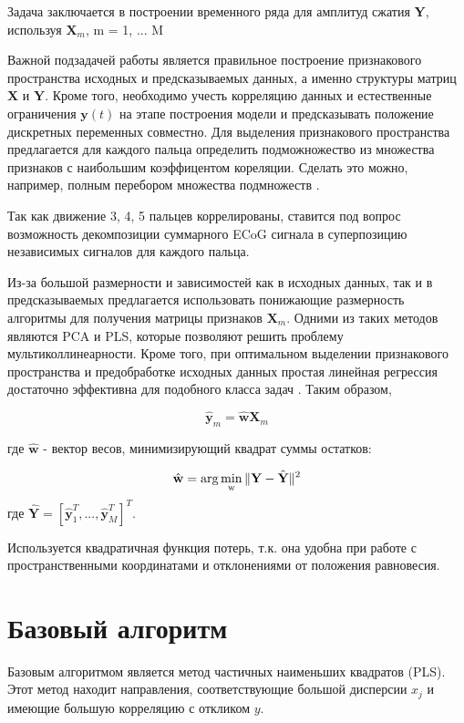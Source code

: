 \documentclass[12pt,twoside]{article}
\begin{document}
Задача заключается в построении временного ряда для амплитуд сжатия \textbf{Y}, используя $\textbf{X}_m$, m = 1, ... M
		
		Важной подзадачей работы является правильное построение признакового пространства исходных и предсказываемых данных, а именно структуры матриц $\mathbf{X}$ и $\mathbf{Y}$. Кроме того, необходимо учесть корреляцию данных и естественные ограничения $\mathbf{y}(t)$ на этапе построения модели и предсказывать положение дискретных переменных совместно. Для выделения признакового пространства предлагается для каждого пальца определить подможножество из множества признаков с наибольшим коэффицентом кореляции. Сделать это можно, например, полным перебором множества подмножеств   \cite{oai:hal.inria.fr:hal-00762316}. 
		

Так как движение 3, 4, 5 пальцев коррелированы, ставится под вопрос возможность декомпозиции суммарного ECoG сигнала в суперпозицию независимых сигналов для каждого пальца.

Из-за большой размерности и зависимостей как в исходных данных, так и в предсказываемых предлагается использовать понижающие размерность алгоритмы для получения матрицы признаков $ \textbf{X}_m $. Одними из таких методов являются PCA и PLS, которые позволяют решить проблему мультиколлинеарности. Кроме того, при оптимальном выделении признакового пространства и предобработке исходных данных простая линейная регрессия достаточно эффективна для подобного класса задач \cite{oai:hal.inria.fr:hal-00762316}. Таким образом,

\begin{equation}
\hat{\textbf{y}}_m = \hat{\textbf{w}} \textbf{X}_m 
\end{equation}

где $ \hat{\textbf{w}} $ - вектор весов, минимизирующий квадрат суммы остатков:

\begin{equation}
\hat{\textbf{w}} = \rm arg \min\limits_{w} \| \textbf{Y} - \hat{\textbf{Y}} \|^2
\end{equation}
где $\hat{\textbf{Y}} = [\hat{\textbf{y}}^T_1, ..., \hat{\textbf{y}}^T_M ]^T$.

Используется квадратичная функция потерь, т.к. она удобна при работе с пространственными координатами и отклонениями от положения равновесия\cite{Ziqian2018}.


\section{Базовый алгоритм}
Базовым алгоритмом является метод частичных наименьших квадратов (PLS). Этот метод находит направления, соответствующие большой дисперсии $x_j$ и имеющие большую корреляцию с откликом $y$.
\end{document}
